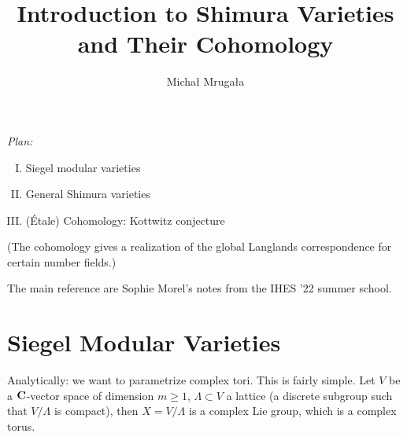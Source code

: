 

\usepackage{stmaryrd}
\usepackage[nameinlink]{cleveref}

\newcommand{\SC}{\mathcal{C}}
\newcommand{\OO}{\mathcal{O}}
\def\coker{\operatorname{coker}}
\def\bL{\mathbf{L}}
\def\CT{\mathcal{T}}
\def\Aut{\operatorname{Aut}}
\def\wt{\widetilde}
\def\ko{\mathfrak{o}}
\def\kt{\mathfrak{t}}
\newcommand{\CX}{\mathcal{X}}
\def\coker{\operatorname{coker}}
\def\bL{\mathbf{L}}
\def\wh{\widehat}
\def\CI{\mathcal{I}}
\def\et{^\text{\'et}}
\def\sep{^\text{sep}}
\def\pr{\operatorname{pr}}
\def\img{\operatorname{im}}
\def\Sym{\operatorname{Sym}}
\def\CG{\mathcal{G}}
\def\N{\mathbb{N}}
\def\th{^{\mathrm{th}}}
\def\CN{\mathcal{N}}
\def\Inf{\operatorname{Inf}}
\def\rank{\operatorname{rank}}
\def\Pic{\operatorname{Pic}}
\def\i{\operatorname{inv}}
\def\Diag{\operatorname{Diag}}
\def\G{\mathbb{G}}
\def\End{\operatorname{End}}
\def\det{\operatorname{det}}
\def\SL{\bb{SL}}
\def\Rep{\operatorname{Rep}}
\def\Repf{\operatorname{Rep}^{\text{fd}}}
\def\Res{\operatorname{Res}}
\def\Ind{\operatorname{Ind}}
\def\CL{\mathcal{L}}
\def\Zc{\underline{\mathbb{Z}}}
\def\DAet{\operatorname{DA}^{\text{\'et}}}
\def\SH{\operatorname{SH}}
\def\Sh{\operatorname{Sh}}
\def\PSh{\operatorname{PSh}}
\def\Cone{\operatorname{Cone}}
\def\A{\cat{A}}
\def\Ch{\operatorname{Ch}}
\def\EssIm{\operatorname{EssIm}}
\def\colim{\operatorname{colim}}
\def\ft{^{\text{(f.t)}}}
\def\an{^{\text{an}}}
\def\P{\mathbb{P}}
\def\CA{\mathcal{A}}
\def\Mat{\operatorname{Mat}}
\def\H{\mathcal{H}}
\def\Sp{\bb{Sp}}
\def\Stab{\operatorname{Stab}}
\def\CE{\mathcal{E}}

\title{Introduction to Shimura Varieties and Their Cohomology}
\author{Micha{\l} Mruga{\l}a}


\maketitle
\emph{Plan:}
\begin{enumerate}[I)]
	\item Siegel modular varieties
	\item General Shimura varieties
	\item (\'Etale) Cohomology: Kottwitz conjecture
\end{enumerate}
(The cohomology gives a realization of the global Langlands correspondence for certain number fields.)

The main reference are Sophie Morel's notes from the IHES '22 summer school.

\section{Siegel Modular Varieties}
Analytically: we want to parametrize complex tori. This is fairly simple. Let $V$ be a $\mathbf{C}$-vector space of dimension $m\ge 1$, $\Lambda\subset V$ a lattice (a discrete subgroup such that $V /\Lambda$ is compact), then $X=V /\Lambda$ is a complex Lie group, which is a complex torus. 

